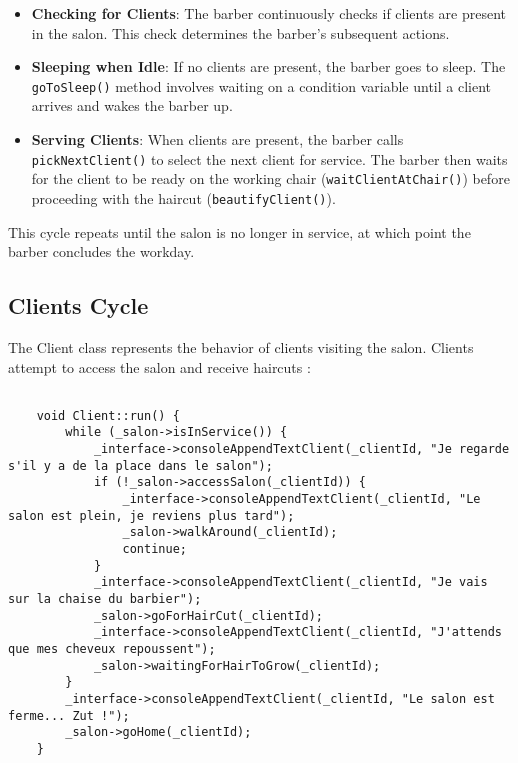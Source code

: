 \documentclass{article}
\begin{document}
    \begin{itemize}
    \item \textbf{Checking for Clients}: The barber continuously checks if clients are present in the salon. This check determines the barber's subsequent actions.
    \item \textbf{Sleeping when Idle}: If no clients are present, the barber goes to sleep. The \texttt{goToSleep()} method involves waiting on a condition variable until a client arrives and wakes the barber up.
    \item \textbf{Serving Clients}: When clients are present, the barber calls \texttt{pickNextClient()} to select the next client for service. The barber then waits for the client to be ready on the working chair (\texttt{waitClientAtChair()}) before proceeding with the haircut (\texttt{beautifyClient()}).
    \end{itemize}

    This cycle repeats until the salon is no longer in service, at which point the barber concludes the workday.

    \pagebreak

    \subsection{Clients Cycle}

    The Client class represents the behavior of clients visiting the salon. Clients attempt to access the salon and receive haircuts :

    \begin{lstlisting}[caption={The clients operational cycle}, captionpos=b, label=lst:2]

    void Client::run() {
        while (_salon->isInService()) {
            _interface->consoleAppendTextClient(_clientId, "Je regarde s'il y a de la place dans le salon");
            if (!_salon->accessSalon(_clientId)) {
                _interface->consoleAppendTextClient(_clientId, "Le salon est plein, je reviens plus tard");
                _salon->walkAround(_clientId);
                continue;
            }
            _interface->consoleAppendTextClient(_clientId, "Je vais sur la chaise du barbier");
            _salon->goForHairCut(_clientId);
            _interface->consoleAppendTextClient(_clientId, "J'attends que mes cheveux repoussent");
            _salon->waitingForHairToGrow(_clientId);
        }
        _interface->consoleAppendTextClient(_clientId, "Le salon est ferme... Zut !");
        _salon->goHome(_clientId);
    }

    \end{lstlisting}
\end{document}
